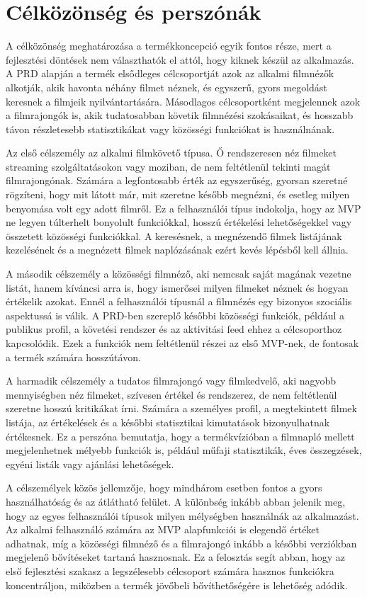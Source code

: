 \section{Célközönség és perszónák}

A célközönség meghatározása a termékkoncepció egyik fontos része, mert a fejlesztési döntések nem választhatók el attól, hogy kiknek készül az alkalmazás. A PRD alapján a termék elsődleges célcsoportját azok az alkalmi filmnézők alkotják, akik havonta néhány filmet néznek, és egyszerű, gyors megoldást keresnek a filmjeik nyilvántartására. Másodlagos célcsoportként megjelennek azok a filmrajongók is, akik tudatosabban követik filmnézési szokásaikat, és hosszabb távon részletesebb statisztikákat vagy közösségi funkciókat is használnának.

Az első célszemély az alkalmi filmkövető típusa. Ő rendszeresen néz filmeket streaming szolgáltatásokon vagy moziban, de nem feltétlenül tekinti magát filmrajongónak. Számára a legfontosabb érték az egyszerűség, gyorsan szeretné rögzíteni, hogy mit látott már, mit szeretne később megnézni, és esetleg milyen benyomása volt egy adott filmről. Ez a felhasználói típus indokolja, hogy az MVP ne legyen túlterhelt bonyolult funkciókkal, hosszú értékelési lehetőségekkel vagy összetett közösségi funkciókkal. A keresésnek, a megnézendő filmek listájának kezelésének és a megnézett filmek naplózásának ezért kevés lépésből kell állnia.

A második célszemély a közösségi filmnéző, aki nemcsak saját magának vezetne listát, hanem kíváncsi arra is, hogy ismerősei milyen filmeket néznek és hogyan értékelik azokat. Ennél a felhasználói típusnál a filmnézés egy bizonyos szociális aspektussá is válik. A PRD-ben szereplő későbbi közösségi funkciók, például a publikus profil, a követési rendszer és az aktivitási feed ehhez a célcsoporthoz kapcsolódik. Ezek a funkciók nem feltétlenül részei az első MVP-nek, de fontosak a termék számára hosszútávon.

A harmadik célszemély a tudatos filmrajongó vagy filmkedvelő, aki nagyobb mennyiségben néz filmeket, szívesen értékel és rendszerez, de nem feltétlenül szeretne hosszú kritikákat írni. Számára a személyes profil, a megtekintett filmek listája, az értékelések és a későbbi statisztikai kimutatások bizonyulhatnak értékesnek. Ez a perszóna bemutatja, hogy a termékvízióban a filmnapló mellett megjelenhetnek mélyebb funkciók is, például műfaji statisztikák, éves összegzések, egyéni listák vagy ajánlási lehetőségek.

A célszemélyek közös jellemzője, hogy mindhárom esetben fontos a gyors használhatóság és az átlátható felület. A különbség inkább abban jelenik meg, hogy az egyes felhasználói típusok milyen mélységben használnák az alkalmazást. Az alkalmi felhasználó számára az MVP alapfunkciói is elegendő értéket adhatnak, míg a közösségi filmnéző és a filmrajongó inkább a későbbi verziókban megjelenő bővítéseket tartaná hasznosnak. Ez a felosztás segít abban, hogy az első fejlesztési szakasz a legszélesebb célcsoport számára hasznos funkciókra koncentráljon, miközben a termék jövőbeli bővíthetőségére is lehetőség adódik.


